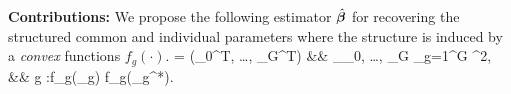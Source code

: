 {\bf Contributions:}
We propose the following estimator $\hat{\boldsymbol{\beta}}$ for recovering the structured common and individual parameters where the structure is induced by a \emph{convex} functions $f_g(\cdot)$.
\be
	\nr \label{eq:super}
	\hbbe = (\hbbe_0^T, \dots, \hbbe_G^T) &\in& \argmin_{\bbeta _0, \dots, \bbeta _G}  \sum_{g=1}^{G} ^2,
	\\ \nr
	&&
	 \quad \forall g \in [G]:f_g(\bbeta _g) \leq f_g(\bbeta _g^*).
\ee


